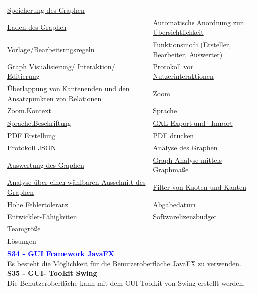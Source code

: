 \documentclass[enabledeprecatedfontcommands,fontsize=11pt,paper=a4,twoside]{scrartcl}
\newcounter{one}
\newcommand{\cb}[1]{{\textcolor{blue}{#1}}}
\begin{document}
\begin{tabular} {|p{8cm} p{8cm}|}
		\hyperlink {v}{Speicherung des Graphen} \\
		\hyperlink {w}{Laden des Graphen} &
		\hyperlink {x}{Automatische Anordnung zur Übersichtlichkeit} \\
		\hyperlink {y}{Vorlage/Bearbeitsungsregeln} &
		\hyperlink {z}{Funktionsmodi (Ersteller, Bearbeiter, Auswerter)} \\
		\hyperlink {aa}{Graph Visualisierung/ Interaktion/ Editierung}&
		\hyperlink {bb}{Protokoll von Nutzerinteraktionen} \\
		\hyperlink {cc}{Überlappung von Kantenenden und den Ansatzpunkten von Relationen} &
		\hyperlink {ee}{Zoom} \\
		\hyperlink {ff}{Zoom.Kontext} &
		\hyperlink {gg}{Sprache} \\
		\hyperlink {hh}{Sprache.Beschriftung} &
		\hyperlink {jj}{GXL-Export und –Import} \\
		\hyperlink {kk}{PDF Erstellung} &
		\hyperlink {ll}{PDF drucken} \\
		\hyperlink {mm}{Protokoll JSON} &
		\hyperlink {oo}{Analyse des Graphen} \\
		\hyperlink {pp}{Auswertung des Graphen} &
		\hyperlink {qq}{Graph-Analyse mittels Graphmaße} \\ 
		\hyperlink {rr}{Analyse über einen wählbaren Ausschnitt des Graphen} &
		\hyperlink {ss}{Filter von Knoten und Kanten} \\
		\hyperlink {tt}{Hohe Fehlertoleranz} &
		\hyperlink {uu}{Abgabedatum} \\
		\hyperlink {vv}{Entwickler-Fähigkeiten} &
		\hyperlink {ww}{Softwarelizenzbudget} \\
		\hyperlink {xx}{Teamgröße} &
		\\ \hline
		\multicolumn{2}{|l|}{Lösungen} \\
		\multicolumn{2}{|l|}{\parbox{16cm}{
				\textbf{\cb{\hypertarget{kkk}{S34 - GUI Framework JavaFX}}} \\
				Es besteht die Möglichkeit für die Benutzeroberfläche JavaFX zu verwenden.  \\
				\textbf{S35 - GUI- Toolkit Swing} \\
				Die Benutzeroberfläche kann mit dem GUI-Toolkit von Swing erstellt werden.
		} }\\ \hline
		
	\end{tabular}\\ \\ \\
	
\end{document}
